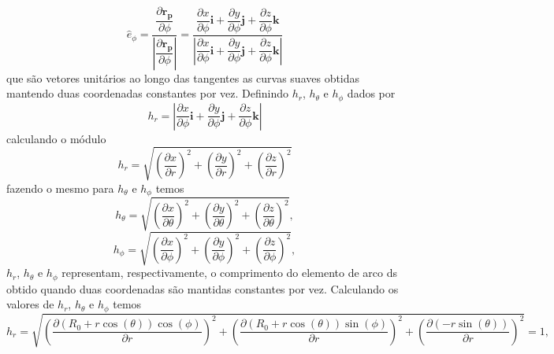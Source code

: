 \documentclass[12pt,oneside,a4paper]{abntex2}
\begin{document}
\begin{equation}
\hat{e}_\phi = \frac{\dfrac{\partial \bm{r_p}}{\partial \phi}}{ | \dfrac{\partial \bm{r_p}}{\partial \phi} |} = \frac{\dfrac{\partial x}{\partial \phi}\bm{i} + \dfrac{\partial y}{\partial \phi}\bm{j} + \dfrac{\partial z}{\partial \phi}\bm{k}}{ | \dfrac{\partial x}{\partial \phi}\bm{i} + \dfrac{\partial y}{\partial \phi}\bm{j} + \dfrac{\partial z}{\partial \phi}\bm{k} |}
\end{equation}
que são vetores unitários ao longo das tangentes as curvas suaves obtidas mantendo duas coordenadas constantes por vez.
Definindo $h_r$, $h_\theta$ e $h_\phi$ dados por 
\begin{equation}
h_r = | \dfrac{\partial x}{\partial \phi}\bm{i} + \dfrac{\partial y}{\partial \phi}\bm{j} + \dfrac{\partial z}{\partial \phi}\bm{k} |
\end{equation}
calculando o módulo
\begin{equation}
h_r = \sqrt{ \left(\dfrac{\partial x}{\partial r} \right)^2 + \left(\dfrac{\partial y}{\partial r}\right)^2 + \left(\dfrac{\partial z}{\partial r}\right)^2 }
\end{equation}
fazendo o mesmo para $h_\theta$ e $h_\phi$ temos
\begin{equation}
h_\theta = \sqrt{ \left(\dfrac{\partial x}{\partial \theta} \right)^2 + \left(\dfrac{\partial y}{\partial \theta}\right)^2 + \left(\dfrac{\partial z}{\partial \theta}\right)^2 },
\end{equation}
\begin{equation}
h_\phi = \sqrt{ \left(\dfrac{\partial x}{\partial \phi} \right)^2 + \left(\dfrac{\partial y}{\partial \phi}\right)^2 + \left(\dfrac{\partial z}{\partial \phi}\right)^2 },
\end{equation}
$h_r$, $h_\theta$ e $h_\phi$ representam, respectivamente, o comprimento do elemento de arco ds obtido quando duas coordenadas são mantidas constantes por vez.
Calculando os valores de $h_r$, $h_\theta$ e $h_\phi$ temos
\begin{equation}
h_r = \sqrt{ \left(\dfrac{\partial (R_0+r \cos(\theta)) \cos(\phi)}{\partial r} \right)^2 + \left(\dfrac{\partial (R_0+r \cos(\theta)) \sin(\phi)}{\partial r}\right)^2 + \left(\dfrac{\partial (- r \sin(\theta))}{\partial r}\right)^2 } = 1,
\end{equation}
\end{document}
